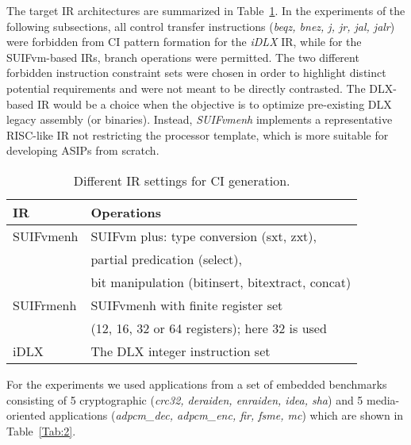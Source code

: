 \documentclass{comjnl}
\begin{document}
The target IR architectures are summarized in Table~\ref{Tab:1}. In the experiments of the following subsections, all control transfer instructions ({\it beqz, bnez, j, jr, jal, jalr}) were forbidden from CI pattern formation for the {\it iDLX} IR, while for the SUIFvm-based IRs, branch operations were permitted. The two different forbidden instruction constraint sets were chosen in order to highlight distinct potential requirements and were not meant to be directly contrasted. The DLX-based IR would be a choice when the objective is to optimize pre-existing DLX legacy assembly (or binaries). Instead, {\it SUIFvmenh} implements a representative RISC-like IR not restricting the processor template, which is more suitable for developing ASIPs from scratch.  

\begin{table}
  \renewcommand{\arraystretch}{0.925}
  \vspace{-0.25cm}
  \caption{Different IR settings for CI generation.}
  \centering
  {\footnotesize
  \begin{tabular}{|l|l|}
    \hline
    \multicolumn{1}{|m{1.5cm}|}{\centering IR}
    &\multicolumn{1}{m{5.0cm}|}{\centering Operations}\\
    \hline
    SUIFvmenh & SUIFvm plus: type conversion (sxt, zxt),\\
    & partial predication (select),\\ 
    & bit manipulation (bitinsert, bitextract, concat) \\
    \hline
    SUIFrmenh & SUIFvmenh with finite register set \\
    & (12, 16, 32 or 64 registers); here 32 is used \\
    \hline
    iDLX & The DLX integer instruction set \\
    \hline
  \end{tabular}
  }
  \label{Tab:1}
\end{table}

For the experiments we used applications from a set of embedded benchmarks consisting of 5 cryptographic ({\it crc32, deraiden, enraiden, idea, sha}) and 5 media-oriented applications ({\it adpcm\_dec, adpcm\_enc, fir, fsme, mc}) which are shown in Table~\ref{Tab:2}. 
\end{document}
